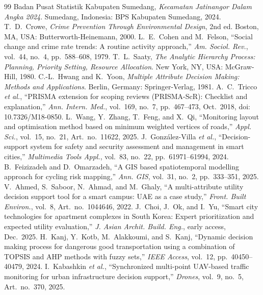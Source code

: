 \documentclass[10pt,twocolumn,a4paper]{article}
\begin{document}
\balance
\begin{thebibliography}{99}
\footnotesize
{} Badan Pusat Statistik Kabupaten Sumedang, \textit{Kecamatan Jatinangor Dalam Angka 2024}. Sumedang, Indonesia: BPS Kabupaten Sumedang, 2024.
 T.\ D.\ Crowe, \textit{Crime Prevention Through Environmental Design}, 2nd ed. Boston, MA, USA: Butterworth-Heinemann, 2000.
 L.\ E.\ Cohen and M.\ Felson, ``Social change and crime rate trends: A routine activity approach,'' \textit{Am. Sociol. Rev.}, vol.\ 44, no.\ 4, pp.\ 588--608, 1979.
 T.\ L.\ Saaty, \textit{The Analytic Hierarchy Process: Planning, Priority Setting, Resource Allocation}. New York, NY, USA: McGraw-Hill, 1980.
 C.-L.\ Hwang and K.\ Yoon, \textit{Multiple Attribute Decision Making: Methods and Applications}. Berlin, Germany: Springer-Verlag, 1981.
 A.\ C.\ Tricco \textit{et al.}, ``PRISMA extension for scoping reviews (PRISMA-ScR): Checklist and explanation,'' \textit{Ann. Intern. Med.}, vol.\ 169, no.\ 7, pp.\ 467--473, Oct.\ 2018, doi: 10.7326/M18-0850.
 L.\ Wang, Y.\ Zhang, T.\ Feng, and X.\ Qi, ``Monitoring layout and optimisation method based on minimum weighted vertices of roads,'' \textit{Appl. Sci.}, vol.\ 15, no.\ 21, Art.\ no.\ 11622, 2025.
 J.\ Gonz\'alez-Villa \textit{et al.}, ``Decision-support system for safety and security assessment and management in smart cities,'' \textit{Multimedia Tools Appl.}, vol.\ 83, no.\ 22, pp.\ 61971--61994, 2024.
 B.\ Feizizadeh and D.\ Omarzadeh, ``A GIS based spatiotemporal modelling approach for cycling risk mapping,'' \textit{Ann. GIS}, vol.\ 31, no.\ 2, pp.\ 333--351, 2025.
 V.\ Ahmed, S.\ Saboor, N.\ Ahmad, and M.\ Ghaly, ``A multi-attribute utility decision support tool for a smart campus: UAE as a case study,'' \textit{Front. Built Environ.}, vol.\ 8, Art.\ no.\ 1044646, 2022.
 J.\ Choi, J.\ Ok, and I.\ Yu, ``Smart city technologies for apartment complexes in South Korea: Expert prioritization and expected utility evaluation,'' \textit{J. Asian Archit. Build. Eng.}, early access, Dec.\ 2025.
 H.\ Kanj, Y.\ Kotb, M.\ Alakkoumi, and S.\ Kanj, ``Dynamic decision making process for dangerous good transportation using a combination of TOPSIS and AHP methods with fuzzy sets,'' \textit{IEEE Access}, vol.\ 12, pp.\ 40450--40479, 2024.
 I.\ Kabashkin \textit{et al.}, ``Synchronized multi-point UAV-based traffic monitoring for urban infrastructure decision support,'' \textit{Drones}, vol.\ 9, no.\ 5, Art.\ no.\ 370, 2025.

\end{thebibliography}
\end{document}
